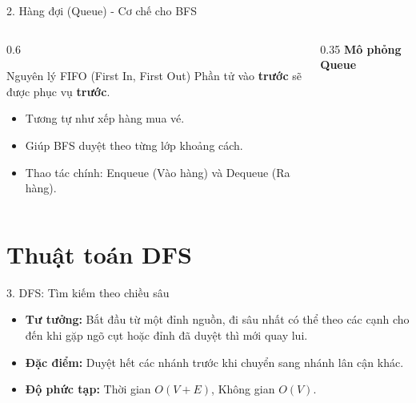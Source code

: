 \documentclass[aspectratio=169]{beamer}
\begin{document}
\begin{frame}{2. Hàng đợi (Queue) - Cơ chế cho BFS}
    \begin{columns}
        \begin{column}{0.6\textwidth}
            \begin{block}{Nguyên lý FIFO (First In, First Out)}
                Phần tử vào \textbf{trước} sẽ được phục vụ \textbf{trước}.
            \end{block}
            \begin{itemize}
                \item Tương tự như xếp hàng mua vé.
                \item Giúp BFS duyệt theo từng lớp khoảng cách.
                \item Thao tác chính: Enqueue (Vào hàng) và Dequeue (Ra hàng).
            \end{itemize}
        \end{column}
        \begin{column}{0.35\textwidth}
            \centering \textbf{Mô phỏng Queue}\\
        \end{column}
    \end{columns}
\end{frame}

\section{Thuật toán DFS}
\begin{frame}{3. DFS: Tìm kiếm theo chiều sâu}
    \begin{itemize}
        \item \textbf{Tư tưởng:} Bắt đầu từ một đỉnh nguồn, đi sâu nhất có thể theo các cạnh cho đến khi gặp ngõ cụt hoặc đỉnh đã duyệt thì mới quay lui.
        \item \textbf{Đặc điểm:} Duyệt hết các nhánh trước khi chuyển sang nhánh lân cận khác.
        \item \textbf{Độ phức tạp:} Thời gian $O(V + E)$, Không gian $O(V)$.
    \end{itemize}
\end{frame}
\end{document}
